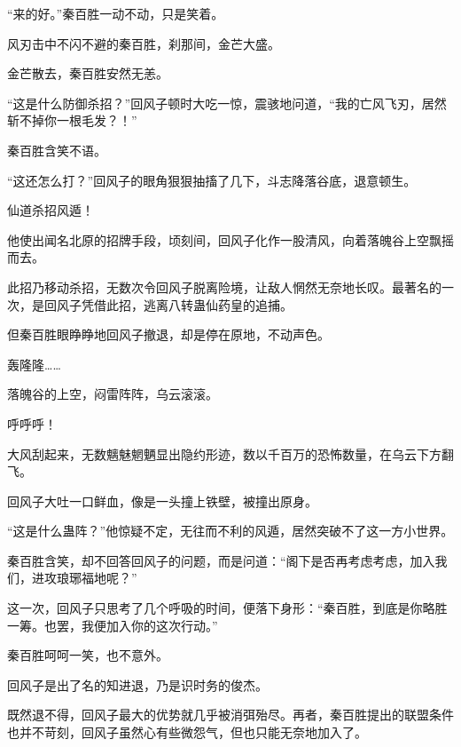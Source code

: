 \begin{this_body}
“来的好。”秦百胜一动不动，只是笑着。

风刃击中不闪不避的秦百胜，刹那间，金芒大盛。

金芒散去，秦百胜安然无恙。

“这是什么防御杀招？”回风子顿时大吃一惊，震骇地问道，“我的亡风飞刃，居然斩不掉你一根毛发？！”

秦百胜含笑不语。

“这还怎么打？”回风子的眼角狠狠抽搐了几下，斗志降落谷底，退意顿生。

仙道杀招风遁！

他使出闻名北原的招牌手段，顷刻间，回风子化作一股清风，向着落魄谷上空飘摇而去。

此招乃移动杀招，无数次令回风子脱离险境，让敌人惘然无奈地长叹。最著名的一次，是回风子凭借此招，逃离八转蛊仙药皇的追捕。

但秦百胜眼睁睁地回风子撤退，却是停在原地，不动声色。

轰隆隆……

落魄谷的上空，闷雷阵阵，乌云滚滚。

呼呼呼！

大风刮起来，无数魑魅魍魉显出隐约形迹，数以千百万的恐怖数量，在乌云下方翻飞。

回风子大吐一口鲜血，像是一头撞上铁壁，被撞出原身。

“这是什么蛊阵？”他惊疑不定，无往而不利的风遁，居然突破不了这一方小世界。

秦百胜含笑，却不回答回风子的问题，而是问道：“阁下是否再考虑考虑，加入我们，进攻琅琊福地呢？”

这一次，回风子只思考了几个呼吸的时间，便落下身形：“秦百胜，到底是你略胜一筹。也罢，我便加入你的这次行动。”

秦百胜呵呵一笑，也不意外。

回风子是出了名的知进退，乃是识时务的俊杰。

既然退不得，回风子最大的优势就几乎被消弭殆尽。再者，秦百胜提出的联盟条件也并不苛刻，回风子虽然心有些微怨气，但也只能无奈地加入了。

\end{this_body}

